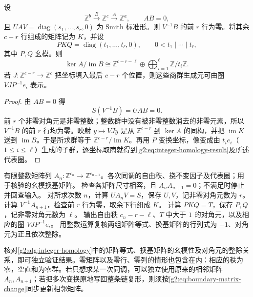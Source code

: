 \begin{proposition}\label{g2:prop:integer-homology-matrices}
	设
	\[
		\mathbb Z^b\xrightarrow{B}\mathbb Z^c\xrightarrow{A}\mathbb Z^a,
		\qquad AB=0,
	\]
	且 \(UAV=\operatorname{diag}(s_1,\ldots,s_r,0)\) 为 Smith 标准形。则 \(V^{-1}B\) 的前 \(r\) 行为零。将其余 \(c-r\) 行组成的矩阵记为 \(K\)，并设
	\[
		PKQ=\operatorname{diag}(t_1,\ldots,t_\ell,0),
		\qquad 0<t_1\mid\cdots\mid t_\ell,
	\]
	其中 \(P,Q\) 幺模。则
	\begin{equation}\label{g2:eq:integer-homology-result}
		\ker A/\operatorname{im}B
		\cong\mathbb Z^{c-r-\ell}\oplus
		\bigoplus_{i=1}^\ell\mathbb Z/t_i\mathbb Z.
	\end{equation}
	若 \(J:\mathbb Z^{c-r}\to\mathbb Z^c\) 把坐标填入最后 \(c-r\) 个位置，则这些商群生成元可由圈 \(VJP^{-1}e_i\) 表示。
\end{proposition}
\begin{proof}
	由 \(AB=0\) 得
	\[
		S(V^{-1}B)=UAB=0.
	\]
	前 \(r\) 个非零对角元是非零整数；整数群中没有被非零整数消去的非零元素，所以 \(V^{-1}B\) 的前 \(r\) 行均为零。映射 \(y\mapsto VJy\) 是从 \(\mathbb Z^{c-r}\) 到 \(\ker A\) 的同构，并把 \(\operatorname{im}K\) 送到 \(\operatorname{im}B\)。于是所求群等于 \(\mathbb Z^{c-r}/\operatorname{im}K\)。再用 \(P\) 变换坐标，像变成由 \(t_ie_i\)（\(1\le i\le\ell\)）生成的子群，逐坐标取商就得到\eqref{g2:eq:integer-homology-result}及所述代表圈。
\end{proof}

\begin{algorithm}[tbp]
	\caption{整数同调}
	\label{g2:alg:integer-homology}
	\begin{algorithmsteps}{有限整数矩阵列 \(A_n:\mathbb Z^{c_n}\to\mathbb Z^{c_{n-1}}\)。}{各次同调的自由秩、挠不变因子及代表圈；用于核验的幺模换基矩阵。}
		\State 检查各矩阵尺寸相容，且 \(A_nA_{n+1}=0\)；不满足时停止并回查输入。
		\State 对所求次数 \(n\)，计算 \(UA_nV=S\)，保存 \(U,V\)，记非零对角元数为 \(r\)。
		\State 计算 \(V^{-1}A_{n+1}\)，检查前 \(r\) 行为零，取余下行组成 \(K\)。
		\State 计算 \(PKQ=T\)，保存 \(P,Q\)，记非零对角元数为 \(\ell\)。
		\State 输出自由秩 \(c_n-r-\ell\)、\(T\) 中大于 \(1\) 的对角元，以及相应的圈 \(VJP^{-1}e_i\)。
		\State 用整数运算复核两组矩阵等式、换基矩阵的行列式为 \(\pm1\)、对角元为正且依次整除。
	\end{algorithmsteps}
\end{algorithm}

核对\cref{g2:alg:integer-homology}中的矩阵等式、换基矩阵的幺模性及对角元的整除关系，即可独立验证结果。零矩阵以及零行、零列的情形也包含在内：相应的秩为零，空直和为零群。若只想求某一次同调，可以独立使用原来的相邻矩阵 \(A_n,A_{n+1}\)；若把多次变换原地写回整条链复形，则须按\eqref{g2:eq:boundary-matrix-change}同步更新相邻矩阵。

